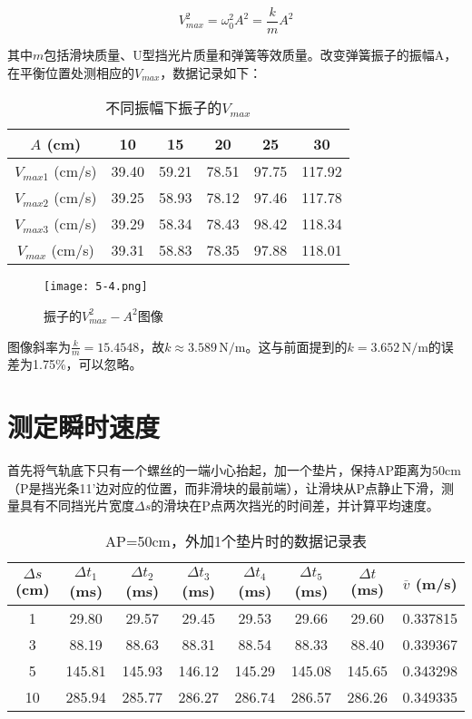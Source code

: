 \documentclass[12pt]{article}
\begin{document}
\[
    V_{max}^2=\omega_0^2A^2=\frac{k}{m}A^2
\]

其中$m$包括滑块质量、U型挡光片质量和弹簧等效质量。改变弹簧振子的振幅A，在平衡位置处测相应的$V_{max}$，数据记录如下：

\begin{table}[htbp]
    \centering
    \begin{tabular}{|c|c|c|c|c|c|}
    \hline
    $A$ (cm) & 10   & 15   & 20   & 25   & 30 \\
    \hline
    $V_{max1}$ (cm/s) & 39.40  & 59.21  & 78.51  & 97.75  & 117.92  \\
    \hline
    $V_{max2}$ (cm/s) & 39.25  & 58.93  & 78.12  & 97.46  & 117.78  \\
    \hline
    $V_{max3}$ (cm/s) & 39.29  & 58.34  & 78.43  & 98.42  & 118.34  \\
    \hline
    $V_{max}$ (cm/s) & 39.31  & 58.83  & 78.35  & 97.88  & 118.01  \\
    \hline
    \end{tabular}
    \caption{不同振幅下振子的$V_{max}$}
\end{table}

\begin{figure}[htbp]
    \centering
    \texttt{[image: 5-4.png]}
    \caption{振子的$V_{max}^2-A^2$图像}
\end{figure}

图像斜率为$\frac{k}{m}=15.4548$，故$k\approx3.589\,\mathrm{N/m}$。这与前面提到的$k=3.652\,\mathrm{N/m}$的误差为1.75\%，可以忽略。

\section{测定瞬时速度}
首先将气轨底下只有一个螺丝的一端小心抬起，加一个垫片，保持AP距离为$50$cm（P是挡光条11'边对应的位置，而非滑块的最前端），让滑块从P点静止下滑，测量具有不同挡光片宽度$\Delta s$的滑块在P点两次挡光的时间差，并计算平均速度。

\begin{table}[htbp]
    \centering
    \begin{tabular}{|c|c|c|c|c|c|c|c|}
    \hline
    $\Delta s$ (cm) & $\Delta t_1$ (ms) & $\Delta t_2$ (ms) & $\Delta t_3$ (ms) & $\Delta t_4$ (ms) & $\Delta t_5$ (ms) & $\Delta t$ (ms) & $\overline{v}$ (m/s) \\
    \hline
    1    & 29.80  & 29.57  & 29.45  & 29.53  & 29.66  & 29.60  & 0.337815  \\
    \hline
    3    & 88.19  & 88.63  & 88.31  & 88.54  & 88.33  & 88.40  & 0.339367  \\
    \hline
    5    & 145.81  & 145.93  & 146.12  & 145.29  & 145.08  & 145.65  & 0.343298  \\
    \hline
    10   & 285.94  & 285.77  & 286.27  & 286.74  & 286.57  & 286.26  & 0.349335  \\
    \hline
    \end{tabular}
    \caption{AP=50cm，外加1个垫片时的数据记录表}
\end{table}
\end{document}
